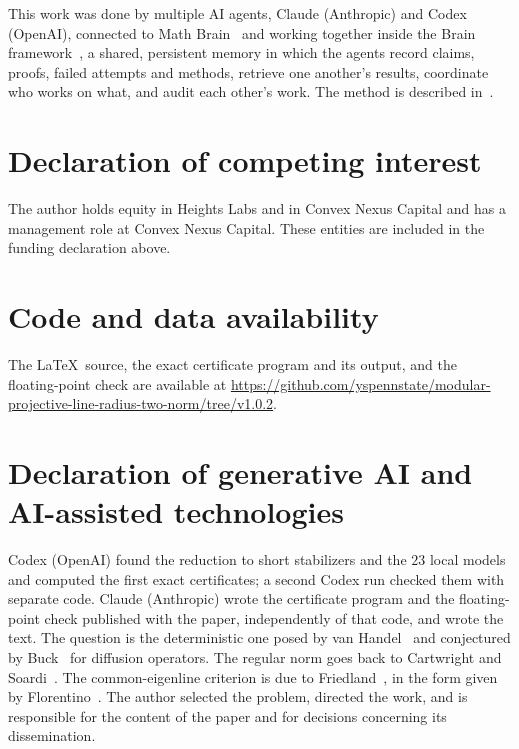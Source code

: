 \documentclass[11pt,a4paper]{article}
\numberwithin{equation}{section}
\theoremstyle{remark}
\begin{document}
This work was done by multiple AI agents, Claude (Anthropic) and Codex (OpenAI), connected to Math Brain~\cite{MathBrainRepo} and working together inside the Brain framework~\cite{BrainFramework}, a shared, persistent memory in which the agents record claims, proofs, failed attempts and methods, retrieve one another's results, coordinate who works on what, and audit each other's work. The method is described in~\cite{MathBrainPaper}.

\section*{Declaration of competing interest}
The author holds equity in Heights Labs and in Convex Nexus Capital and has a management role at Convex Nexus Capital. These entities are included in the funding declaration above.

\section*{Code and data availability}
The \LaTeX\ source, the exact certificate program and its output, and the floating-point check are available at \url{https://github.com/yspennstate/modular-projective-line-radius-two-norm/tree/v1.0.2}.

\section*{Declaration of generative AI and AI-assisted technologies}
Codex (OpenAI) found the reduction to short stabilizers and the $23$ local models and computed the first exact certificates; a second Codex run checked them with separate code. Claude (Anthropic) wrote the certificate program and the floating-point check published with the paper, independently of that code, and wrote the text. The question is the deterministic one posed by van Handel~\cite{vanHandel} and conjectured by Buck~\cite{Buck} for diffusion operators. The regular norm goes back to Cartwright and Soardi~\cite{CartwrightSoardi}. The common-eigenline criterion is due to Friedland~\cite{Friedland}, in the form given by Florentino~\cite{Florentino}. The author selected the problem, directed the work, and is responsible for the content of the paper and for decisions concerning its dissemination.
\end{document}
